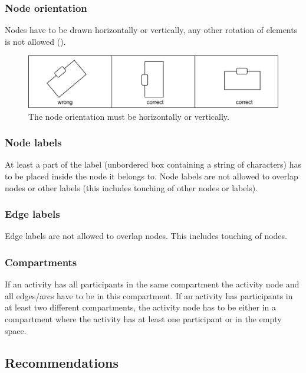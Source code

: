 \subsubsection{Node orientation}

Nodes have to be drawn horizontally or vertically, any other
rotation of elements is not allowed ().

\begin{figure}[h!]
  \centering
  \includegraphics[scale=0.3]{images/layout-orientation}
  \caption{The node orientation must be horizontally or
  vertically.}\label{fig:af:layout5}
\end{figure}

\subsubsection{Node labels}

At least a part of the label (unbordered box containing a string of
characters) has to be placed inside the node it belongs to. Node
labels are not allowed to overlap nodes or other labels (this
includes touching of other nodes or labels).

\subsubsection{Edge labels}

Edge labels are not allowed to overlap nodes. This includes touching
of nodes.

\subsubsection{Compartments}

If an activity has all participants in the same compartment the
activity node and all edges/arcs have to be in this compartment.
If an activity has participants in at least two different
compartments, the activity node has to be either in a compartment
where the activity has at least one participant or in the empty
space.

\subsection{Recommendations}

